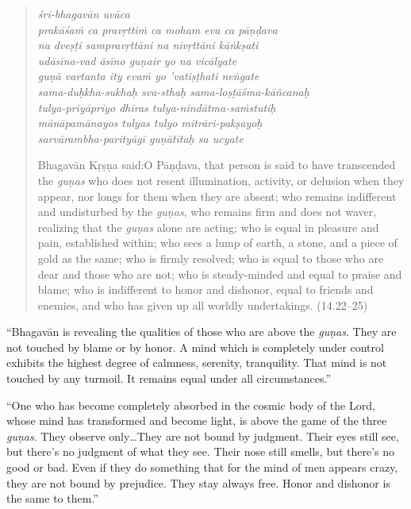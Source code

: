 \documentclass[12pt, twoside, openright]{memoir}
\begin{document}
\par
\begin{verse}
\textit{śrī-bhagavān uvāca} \\
\textit{prakāśaṁ ca pravṛttiṁ ca moham eva ca pāṇḍava} \\
\textit{na dveṣṭi sampravṛttāni na nivṛttāni kāṅkṣati} \\
\textit{udāsīna-vad āsīno guṇair yo na vicālyate} \\
\textit{guṇā vartanta ity evaṁ yo ’vatiṣṭhati neṅgate} \\
\textit{sama-duḥkha-sukhaḥ sva-sthaḥ sama-loṣṭāśma-kāñcanaḥ} \\
\textit{tulya-priyāpriyo dhīras tulya-nindātma-saṁstutiḥ} \\
\textit{mānāpamānayos tulyas tulyo mitrāri-pakṣayoḥ} \\
\textit{sarvārambha-parityāgī guṇātītaḥ sa ucyate}

\noindent \quad Bhagavān Kṛṣṇa said:\linebreak O Pāṇḍava, that person is said to have transcended the \textit{guṇas} who does not resent illumination, activity, or delusion when they appear, nor longs for them when they are absent; who remains indifferent and undisturbed by the \textit{guṇas}, who remains firm and does not waver, realizing that the \textit{guṇas} alone are acting; who is equal in pleasure and pain, established within; who sees a lump of earth, a stone, and a piece of gold as the same; who is firmly resolved; who is equal to those who are dear and those who are not; who is steady-minded and equal to praise and blame; who is indifferent to honor and dishonor, equal to friends and enemies, and who has given up all worldly undertakings. (14.22–25)
\end{verse}
\par



\enquote{Bhagavān is revealing the qualities of those who are above the \textit{guṇas}. They are not touched by blame or by honor. A mind which is completely under control exhibits the highest degree of calmness, serenity, tranquility. That mind is not touched by any turmoil. It remains equal under all circumstances.}

\enquote{One who has become completely absorbed in the cosmic body of the Lord, whose mind has transformed and become light, is above the game of the three \textit{guṇas}. They observe only\ldots They are not bound by judgment. Their eyes still see, but there’s no judgment of what they see. Their nose still smells, but there’s no good or bad. Even if they do something that for the mind of men appears crazy, they are not bound by prejudice. They stay always free. Honor and dishonor is the same to them.}
\end{document}
